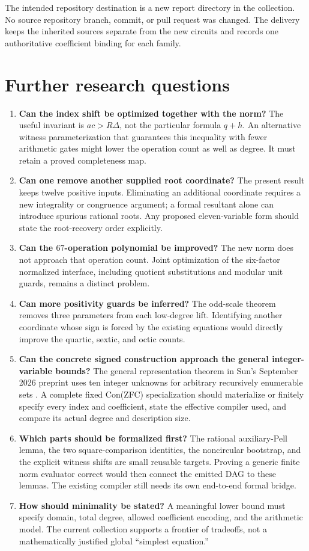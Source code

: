 \documentclass[11pt]{article}
\theoremstyle{remark}\newtheorem{remark}[theorem]{Remark}
\begin{document}
The intended repository destination is a new report directory in the
 collection. No source
repository branch, commit, or pull request was changed. The delivery keeps
the inherited sources separate from the new circuits and records one
authoritative coefficient binding for each family.

\section{Further research questions}
\label{sec:future}

\begin{enumerate}
\item \textbf{Can the index shift be optimized together with the norm?}
The useful invariant is $ac>R\Delta$, not the particular formula $q+h$.
An alternative witness parameterization that guarantees this inequality
with fewer arithmetic gates might lower the operation count as well as
degree. It must retain a proved completeness map.
\item \textbf{Can one remove another supplied root coordinate?}
The present result keeps twelve positive inputs. Eliminating an additional
coordinate requires a new integrality or congruence argument; a formal
resultant alone can introduce spurious rational roots. Any proposed
eleven-variable form should state the root-recovery order explicitly.
\item \textbf{Can the $67$-operation polynomial be improved?}
The new norm does not approach that operation count. Joint optimization
of the six-factor normalized interface, including quotient substitutions
and modular unit guards, remains a distinct problem.
\item \textbf{Can more positivity guards be inferred?}
The odd-scale theorem removes three parameters from each low-degree lift.
Identifying another coordinate whose sign is forced by the existing
equations would directly improve the quartic, sextic, and octic counts.
\item \textbf{Can the concrete signed construction approach the general
integer-variable bounds?}
The general representation theorem in Sun's September 2026 preprint uses
ten integer unknowns for arbitrary recursively enumerable sets
\cite{sun2026}. A complete fixed Con(ZFC) specialization should materialize
or finitely specify every index and coefficient, state the effective
compiler used, and compare its actual degree and description size.
\item \textbf{Which parts should be formalized first?}
The rational auxiliary-Pell lemma, the two square-comparison identities,
the noncircular bootstrap, and the explicit witness shifts are small
reusable targets. Proving a generic finite norm evaluator correct would
then connect the emitted DAG to these lemmas. The existing compiler
still needs its own end-to-end formal bridge.
\item \textbf{How should minimality be stated?}
A meaningful lower bound must specify domain, total degree, allowed
coefficient encoding, and the arithmetic model. The current collection
supports a frontier of tradeoffs, not a mathematically justified global
``simplest equation.''
\end{enumerate}
\end{document}
